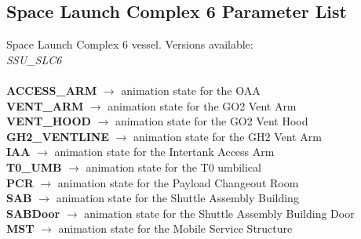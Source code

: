 \documentclass[Space_Shuttle_Ultra_Manual.tex]{subfiles}
\begin{document}
\begin{multicols*}{2}
\subsection{Space Launch Complex 6 Parameter List}
\noindent
Space Launch Complex 6 vessel. Versions available:
\\
\textit{SSU\_SLC6}
\\
\\
\textbf{ACCESS\_ARM} $\rightarrow$ animation state for the OAA
\\
\textbf{VENT\_ARM} $\rightarrow$ animation state for the GO2 Vent Arm
\\
\textbf{VENT\_HOOD} $\rightarrow$ animation state for the GO2 Vent Hood
\\
\textbf{GH2\_VENTLINE} $\rightarrow$ animation state for the GH2 Vent Arm
\\
\textbf{IAA} $\rightarrow$ animation state for the Intertank Access Arm
\\
\textbf{T0\_UMB} $\rightarrow$ animation state for the T0 umbilical
\\
\textbf{PCR} $\rightarrow$ animation state for the Payload Changeout Room
\\
\textbf{SAB} $\rightarrow$ animation state for the Shuttle Assembly Building
\\
\textbf{SABDoor} $\rightarrow$ animation state for the Shuttle Assembly Building Door
\\
\textbf{MST} $\rightarrow$ animation state for the Mobile Service Structure
\end{multicols*}
\end{document}
